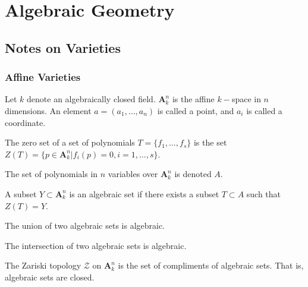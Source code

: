 \documentclass[crop=false,class=article,oneside]{standalone}
\begin{document}
    \ifx\ifmathcoursesalgebraicgeometry\undefined
        \section*{Algebraic Geometry}
        \setcounter{section}{1}
    \fi
    \subsection{Notes on Varieties}
        \subsubsection{Affine Varieties}
            Let $k$ denote an algebraically closed field.
            $\textbf{A}_{k}^n$ is the affine $k-$space in
            $n$ dimensions. An element $a=(a_1,\hdots, a_n)$
            is called a point, and $a_i$ is called a coordinate.
            \begin{definition}
                The zero set of a set of polynomials
                $T=\{f_{1},\hdots,f_{s}\}$ is the set
                $Z(T)%
                 =\{p\in\textbf{A}_{k}^{n}|f_{i}(p)=0,%
                    i=1,\hdots,s\}$.
            \end{definition}
            \begin{notation}
                The set of polynomials in $n$ variables
                over $\textbf{A}_{k}^{n}$ is denoted $A$.
            \end{notation}
            \begin{definition}
                A subset $Y\subset\textbf{A}_{k}^{n}$ is an
                algebraic set if there exists a subset
                $T\subset{A}$ such that $Z(T)=Y$.
            \end{definition}
            \begin{theorem}
                The union of two algebraic
                sets is algebraic.
            \end{theorem}
            \begin{theorem}
                The intersection of two algebraic
                sets is algebraic.
            \end{theorem}
            \begin{definition}
                The Zariski topology $\mathcal{Z}$ on
                $\textbf{A}_{k}^{n}$ is the set of compliments
                of algebraic sets. That is,
                algebraic sets are closed.
            \end{definition}
\end{document}

